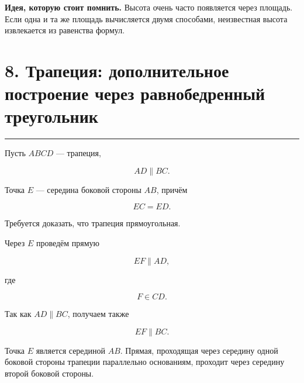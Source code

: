 \documentclass[a4paper,12pt]{article}
\newcommand{\topicline}{
    \textcolor{accent}{\rule{\linewidth}{0.6pt}}
}
\begin{document}
\begin{center}
\end{center}

\textbf{Идея, которую стоит помнить.}
Высота очень часто появляется через площадь.
Если одна и та же площадь вычисляется двумя способами,
неизвестная высота извлекается из равенства формул.


\section*{8. Трапеция: дополнительное построение через равнобедренный треугольник}
\topicline

Пусть $ABCD$ --- трапеция,

\[
AD\parallel BC.
\]

Точка $E$ --- середина боковой стороны $AB$,
причём

\[
EC=ED.
\]

Требуется доказать,
что трапеция прямоугольная.

Через $E$ проведём прямую

\[
EF\parallel AD,
\]

где

\[
F\in CD.
\]

Так как $AD\parallel BC$,
получаем также

\[
EF\parallel BC.
\]

Точка $E$ является серединой $AB$.
Прямая, проходящая через середину одной боковой стороны трапеции
параллельно основаниям,
проходит через середину второй боковой стороны.
\end{document}
